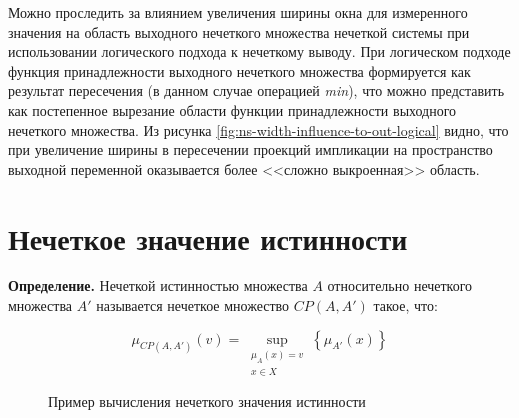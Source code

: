 Можно проследить за влиянием увеличения ширины окна для измеренного значения на область выходного нечеткого множества нечеткой системы при использовании логического подхода к нечеткому выводу. При логическом подходе функция принадлежности выходного нечеткого множества формируется как результат пересечения (в данном случае операцией \textit{min}), что можно представить как постепенное вырезание области функции принадлежности выходного нечеткого множества. Из рисунка \cref{fig:ns-width-influence-to-out-logical} видно, что при увеличение ширины в пересечении проекций импликации на пространство выходной переменной оказывается более <<сложно выкроенная>> область.


\section{Нечеткое значение истинности}

\textbf{Определение.} Нечеткой истинностью множества $A$ относительно нечеткого множества $A'$ называется нечеткое множество $CP(A,A')$ такое, что:

\begin{equation}
\label{eqn:1-ftv}
\mu_{CP(A, A')}(v) = \sup_{\substack{\mu_{A}(x) = v \\ x \in X}}\left\{\mu_{A'}(x)\right\}
\end{equation}

\begin{figure}[ht]
	\centering
	\caption{Пример вычисления нечеткого значения истинности}
	\label{fig:ftv-computation}
\end{figure}

